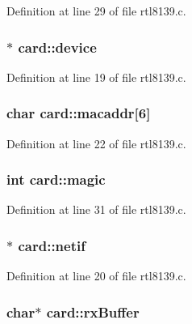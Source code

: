 Definition at line 29 of file rtl8139.\+c.

\hypertarget{structcard_ac4d735012434df4c445edaffce28bd73}{
\subsubsection[{device}]{$\ast$ card\+::device}}\label{structcard_ac4d735012434df4c445edaffce28bd73}


Definition at line 19 of file rtl8139.\+c.

\hypertarget{structcard_abe96f3126aa0a28b86a1748ad1f83f81}{
\subsubsection[{macaddr}]{\setlength{\rightskip}{0pt plus 5cm}char card\+::macaddr\mbox{[}6\mbox{]}}}\label{structcard_abe96f3126aa0a28b86a1748ad1f83f81}


Definition at line 22 of file rtl8139.\+c.

\hypertarget{structcard_a63721f311b12c89790089bbcacc0060b}{
\subsubsection[{magic}]{\setlength{\rightskip}{0pt plus 5cm}int card\+::magic}}\label{structcard_a63721f311b12c89790089bbcacc0060b}


Definition at line 31 of file rtl8139.\+c.

\hypertarget{structcard_ab3123a3dbb6dc38d86488ab37f7759ae}{
\subsubsection[{netif}]{$\ast$ card\+::netif}}\label{structcard_ab3123a3dbb6dc38d86488ab37f7759ae}


Definition at line 20 of file rtl8139.\+c.

\hypertarget{structcard_a5cd3278f0e24fb6942e726b61bb032a6}{
\subsubsection[{rx\+Buffer}]{\setlength{\rightskip}{0pt plus 5cm}char$\ast$ card\+::rx\+Buffer}}\label{structcard_a5cd3278f0e24fb6942e726b61bb032a6}


